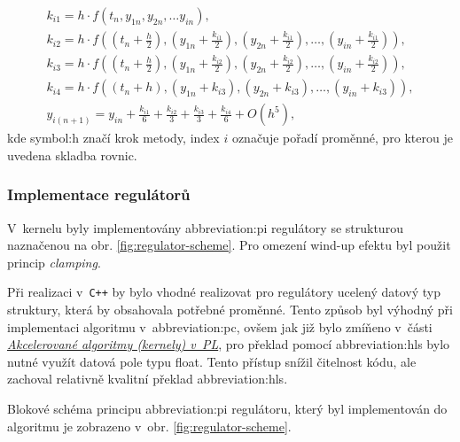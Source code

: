 \documentclass[a4paper, twoside, 11pt]{article}
\begin{document}
		\begin{equation}\label{eq:rk4-algoritmus-math-eq-in-kernel}
			\begin{gathered}
				k_{i 1} = h \cdot f(t_{n}, y_{1{n}}, y_{2{n}},\dots y_{{in}}),\\
				k_{i 2} = h \cdot f((t_{n}+\frac{h}{2}), (y_{1{n}} + \frac{k_{i 1}}{2}),(y_{2{n}}+ \frac{k_{i 1}}{2}),\dots , (y_{{in}}+\frac{k_{i 1}}{2})),\\
				k_{i 3} = h \cdot f((t_{n}+\frac{h}{2}), (y_{1{n}} + \frac{k_{i 2}}{2}), (y_{2{n}}+ \frac{k_{i 2}}{2}),\dots , (y_{{in}}+\frac{k_{i 2}}{2})),\\
				k_{i 4} = h \cdot f((t_{n}+h), (y_{1{n}} + k_{i 3}), (y_{2{n}}+ k_{i 3}),\dots , (y_{{in}}+k_{i 3})),\\
				y_{i(n+1)} = y_{i n} + \frac{k_{i 1}}{6} + \frac{k_{i 2}}{3} + \frac{k_{i 3}}{3} + \frac{k_{i 4}}{6} + O(h^{5}),
			\end{gathered}
		\end{equation}
		kde \gls{symbol:h} značí krok metody, index $i$ označuje pořadí proměnné, pro kterou je uvedena skladba rovnic.\par

		\subsubsection{Implementace regulátorů}
			V~kernelu byly implementovány \gls{abbreviation:pi} regulátory se strukturou naznačenou na obr. \ref{fig:regulator-scheme}. Pro omezení wind-up efektu byl použit princip \textit{clamping}.\par
			Při realizaci v~\texttt{C++} by bylo vhodné realizovat pro regulátory ucelený datový typ struktury, která by obsahovala potřebné proměnné. Tento způsob byl výhodný při implementaci algoritmu v~\gls{abbreviation:pc}, ovšem jak již bylo zmíňeno v~části \hyperref[subsec:akcelerovane-algoritmy-kernely-v-pl]{\textit{Akcelerované algoritmy (kernely) v~PL}}, pro překlad pomocí \gls{abbreviation:hls} bylo nutné využít datová pole typu float. Tento přístup snížil čitelnost kódu, ale zachoval relativně kvalitní překlad \gls{abbreviation:hls}.\par
			Blokové schéma principu \gls{abbreviation:pi} regulátoru, který byl implementován do algoritmu je zobrazeno v~obr. \ref{fig:regulator-scheme}.\par
			
\end{document}
